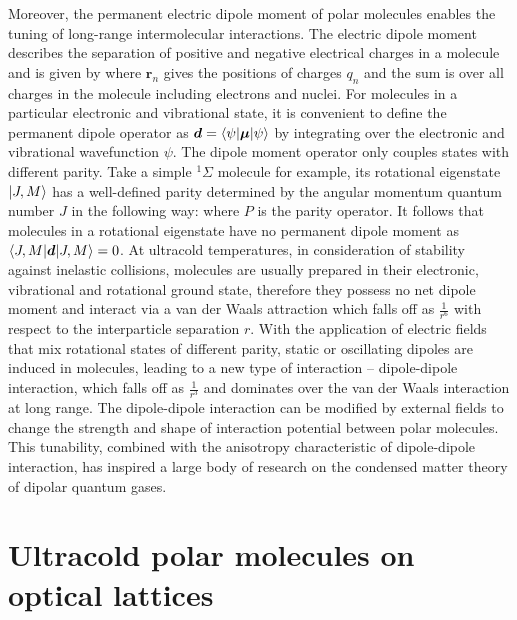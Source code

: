 Moreover, the permanent electric dipole moment of polar molecules enables the tuning of long-range intermolecular 
interactions. The electric dipole moment describes the separation of positive and negative electrical charges
in a molecule and is given by
where $\mathbf{r}_{n}$ gives the positions of charges $q_n$ and the sum is over all charges in the molecule including 
electrons and nuclei. For molecules in a particular electronic and vibrational state, it is convenient to define the permanent
dipole operator as $\boldsymbol{d} = \langle \psi | \boldsymbol{\mu} | \psi \rangle$ by integrating over the electronic and
vibrational wavefunction $\psi$. The dipole moment operator only couples states with different
parity. Take a simple $^{1}\Sigma$ molecule for example,  its rotational eigenstate $| J, M \rangle$  has a well-defined parity 
determined by the angular momentum quantum number $J$ in the following way:
where $P$ is the parity operator. It follows that molecules in a rotational eigenstate have no permanent dipole moment as $\langle J, M | \boldsymbol{d} | J, M \rangle = 0$. At ultracold temperatures, in consideration of stability against inelastic collisions, 
molecules are usually prepared in their electronic, vibrational and rotational ground state, therefore they possess no net
dipole moment and interact via a van der Waals attraction which falls off as $\frac{1 }{r^6}$ with respect to the
interparticle separation $r$. With the application of electric fields that mix rotational states of different parity, static or 
oscillating dipoles are induced in molecules, leading to a new type of interaction -- dipole-dipole interaction, which falls off
as $\frac{1}{r^3}$ and dominates over the van der Waals interaction at long range. The dipole-dipole interaction can be
modified by external fields to change the strength and shape of interaction potential between 
polar molecules\cite{micheli2007, buchler2007a}. This tunability, combined with the anisotropy characteristic of 
dipole-dipole interaction, has inspired a large body of research on the condensed matter theory of dipolar quantum 
gases\cite{baranov2008, lahaye2009, trefzger2011, Baranov2012}. 




\section{Ultracold polar molecules on optical lattices}
\label{sec:opticalLattice}

